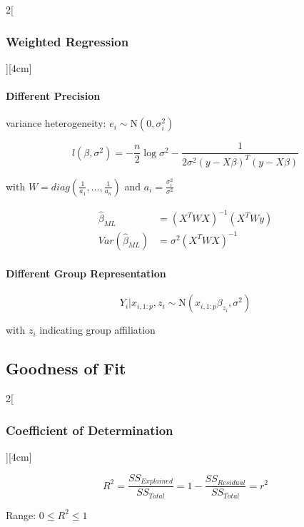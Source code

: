 \documentclass[8pt]{extarticle}
\begin{document}
\begin{multicols}{2}[\subsubsection{Weighted Regression}][4cm]

\paragraph{Different Precision} variance heterogeneity: $e_i \sim \mathrm{N}(0,\sigma_i^2)$

$$l(\beta,\sigma^2) = -\frac{n}{2} \log \sigma^2 - \frac{1}{2\sigma^2(y-X\beta)^T(y-X\beta)}$$

with $W=diag(\frac{1}{a_1},...,\frac{1}{a_n})$ and $a_i = \frac{\sigma_i^2}{\sigma^2}$

\begin{align*}
\hat{\beta}_{ML} &= (X^TWX)^{-1}(X^TWy) \\
Var(\hat{\beta}_{ML}) &= \sigma^2(X^TWX)^{-1}
\end{align*}


\paragraph{Different Group Representation}

$$Y_i|x_{i,1:p}, z_i \sim \mathrm{N}(x_{i,1:p}\beta_{z_i},\sigma^2)$$

with $z_i$ indicating group affiliation


\end{multicols}





\subsection{Goodness of Fit}

\begin{multicols}{2}[\subsubsection{Coefficient of Determination}][4cm]

$$R^2=\frac{SS_{Explained}}{SS_{Total}}=1-\frac{SS_{Residual}}{SS_{Total}}=r^2$$

Range: $0 \le R^2 \le 1$

\end{multicols}

\end{document}
